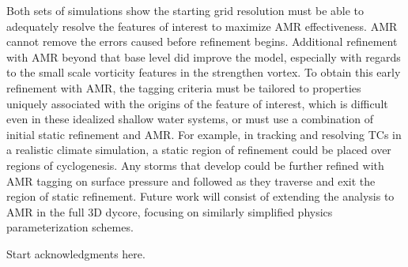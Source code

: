 \documentclass{ametsoc}
\begin{document}
Both sets of simulations show the starting grid resolution must be
able to adequately resolve the features of interest to maximize
AMR effectiveness. AMR cannot remove the errors
caused before refinement begins. Additional refinement with
AMR beyond that base level did improve the model, especially
with regards to the small scale vorticity features in the strengthen vortex.
To obtain this early refinement with AMR, the tagging
criteria must be tailored to properties uniquely associated
with the origins of the feature of interest, which is difficult even in these 
idealized shallow water systems, or must use a combination of initial static refinement 
and AMR. For example, in tracking and resolving TCs in a realistic climate simulation, a static region of refinement
could be placed over regions of cyclogenesis. Any storms that
develop could be further refined with AMR tagging on
surface pressure and followed as they traverse
and exit the region of static refinement.
Future work will consist of extending the analysis
to AMR in the full 3D dycore, focusing on
similarly simplified physics parameterization schemes.


%
\acknowledgments
Start acknowledgments here.

%




\end{document}
